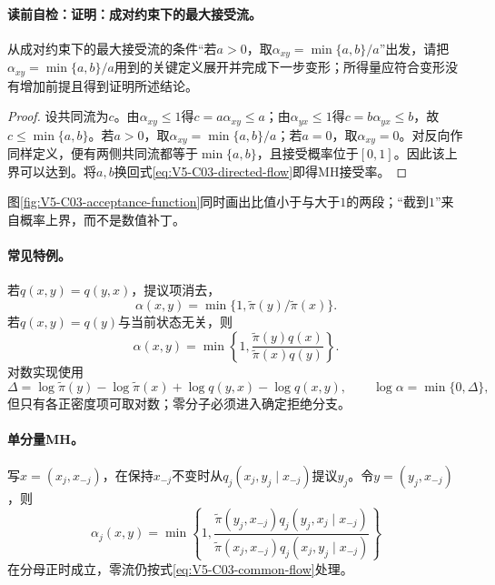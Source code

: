 \paragraph{读前自检：证明：成对约束下的最大接受流。}从成对约束下的最大接受流的条件“若$a>0$，取$\alpha_{xy}=\min\{a,b\}/a$”出发，请把$\alpha_{xy}=\min\{a,b\}/a$用到的关键定义展开并完成下一步变形；所得量应符合变形没有增加前提且得到证明所述结论。\par

\begin{proof}
设共同流为$c$。由$\alpha_{xy}\le1$得$c=a\alpha_{xy}\le a$；由$\alpha_{yx}\le1$得$c=b\alpha_{yx}\le b$，故$c\le\min\{a,b\}$。若$a>0$，取$\alpha_{xy}=\min\{a,b\}/a$；若$a=0$，取$\alpha_{xy}=0$。对反向作同样定义，便有两侧共同流都等于$\min\{a,b\}$，且接受概率位于$[0,1]$。因此该上界可以达到。将$a,b$换回式\eqref{eq:V5-C03-directed-flow}即得MH接受率。
\end{proof}
图\ref{fig:V5-C03-acceptance-function}同时画出比值小于与大于$1$的两段；“截到$1$”来自概率上界，而不是数值补丁。


\paragraph{常见特例。}
若$q(x,y)=q(y,x)$，提议项消去，
\[
\alpha(x,y)=\min\{1,\widetilde\pi(y)/\widetilde\pi(x)\}.
\]
若$q(x,y)=q(y)$与当前状态无关，则
\[
\alpha(x,y)=\min\!\left\{1,
\frac{\widetilde\pi(y)q(x)}
{\widetilde\pi(x)q(y)}\right\}.
\]
对数实现使用
\[
\Delta=\log\widetilde\pi(y)-\log\widetilde\pi(x)
+\log q(y,x)-\log q(x,y),
\qquad \log\alpha=\min\{0,\Delta\},
\]
但只有各正密度项可取对数；零分子必须进入确定拒绝分支。

\paragraph{单分量MH。}
写$x=(x_j,x_{-j})$，在保持$x_{-j}$不变时从$q_j(x_j,y_j\mid x_{-j})$提议$y_j$。令$y=(y_j,x_{-j})$，则
\begin{equation}\label{eq:V5-C03-component-alpha}
\alpha_j(x,y)
=\min\!\left\{1,
\frac{\widetilde\pi(y_j,x_{-j})
q_j(y_j,x_j\mid x_{-j})}
{\widetilde\pi(x_j,x_{-j})
q_j(x_j,y_j\mid x_{-j})}\right\}
\end{equation}
在分母正时成立，零流仍按式\eqref{eq:V5-C03-common-flow}处理。

